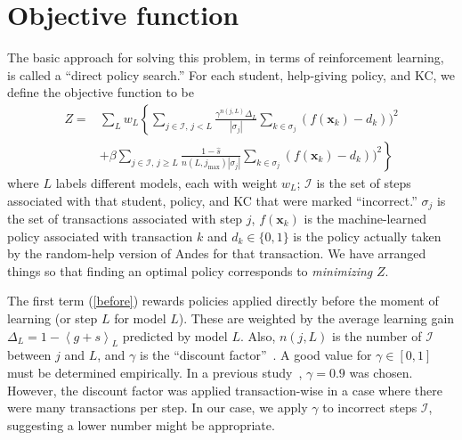\documentclass[11pt,letterpaper]{article}
\begin{document}
\section{Objective function}

The basic approach for solving this problem, in terms of reinforcement
learning, is called a ``direct policy search.''
For each student, help-giving policy, and KC, we define the objective 
function to be 
%
\begin{subequations}
  \label{objective}
  \begin{align}
  Z =& \sum_L w_L \left\{\sum_{j \in \mathcal{I},\,j<L}  
       \frac{\gamma^{n(j,L)} \Delta_L}{\left|\sigma_j\right|}
  \sum_{k\in \sigma_j} \left(f(\mathbf{x}_k)-d_k\right))^2 \right.
     \label{before} \\
  &+\beta \left. \sum_{j \in \mathcal{I},\,j \ge L} \frac{1-\hat{s}}
      {n(L,j_\mathrm{max})\left|\sigma_j\right|}
             \sum_{k\in \sigma_j} \left(f(\mathbf{x}_k)-d_k\right))^2
     \right\}
  \label{after}
  \end{align}
\end{subequations}
%
where $L$ labels different models, each with weight $w_L$;
$\mathcal{I}$ is the set of steps associated
with that student, policy, and KC that were marked ``incorrect.''  
$\sigma_j$ is the set of transactions associated with step $j$,
$f(\mathbf{x}_k)$ is the machine-learned policy associated
with transaction $k$ and
$d_k\in \{0,1\}$ is the
policy actually taken by the random-help version of Andes for that 
transaction.
We have arranged things so that finding an optimal policy 
corresponds to {\em minimizing} $Z$.

The first term (\ref{before}) rewards policies applied directly before
the moment of learning (or step $L$ for model $L$).  
These are weighted by the 
average learning gain $\Delta_L = 1-\left\langle g+s\right\rangle_L$ 
predicted by model $L$.
Also, $n(j,L)$ is the number
of $\mathcal{I}$ between $j$ and $L$, 
and $\gamma$ is the ``discount factor''~\cite{ml}. 
A good value for $\gamma \in [0,1]$ must be determined empirically.
In a previous study~\cite{mint}, $\gamma=0.9$ was chosen.
However, the discount factor was applied transaction-wise in 
a case where there were many transactions per step.  In our case, 
we apply $\gamma$ to incorrect steps $\mathcal{I}$, suggesting a lower
number might be appropriate.
\end{document}

